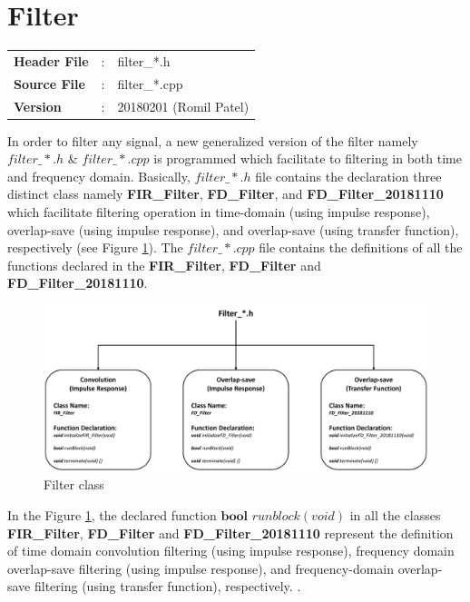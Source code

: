 \section{Filter}
\begin{refsection}
\begin{tcolorbox}	
	\begin{tabular}{p{2.75cm} p{0.2cm} p{10.5cm}}
		\textbf{Header File}   &:& filter\_*.h \\
		\textbf{Source File}   &:& filter\_*.cpp \\
		\textbf{Version}       &:& 20180201 (Romil Patel)
	\end{tabular}
\end{tcolorbox}
In order to filter any signal, a new generalized version of the filter namely $filter\_*.h$ \& $filter\_*.cpp$ is programmed which facilitate to filtering in both time and frequency domain. Basically, $filter\_*.h$ file contains the declaration three distinct class namely \textbf{FIR\_Filter}, \textbf{FD\_Filter}, and \textbf{FD\_Filter\_20181110} which facilitate filtering operation in time-domain (using impulse response), overlap-save (using impulse response), and overlap-save (using transfer function), respectively (see Figure \ref{FilterClass}). The $filter\_*.cpp$ file contains the definitions of all the functions declared in the  \textbf{FIR\_Filter}, \textbf{FD\_Filter} and \textbf{FD\_Filter\_20181110}.\\
\begin{figure}[h]
	\centering
	\includegraphics[width=16cm]{./algorithms/filter/figures/Filter_class.pdf}
	\caption{Filter class}
	\label{FilterClass}
\end{figure}
In the Figure \ref{FilterClass}, the declared function $\textbf{bool}$ $runblock(void)$ in all the classes \textbf{FIR\_Filter}, \textbf{FD\_Filter} and \textbf{FD\_Filter\_20181110} represent the definition of time domain convolution filtering (using impulse response), frequency domain overlap-save filtering (using impulse response), and frequency-domain overlap-save filtering (using transfer function), respectively.   \cite{Kuo,Rappaport2002, Oppenheim1999} .\\

\end{refsection}
